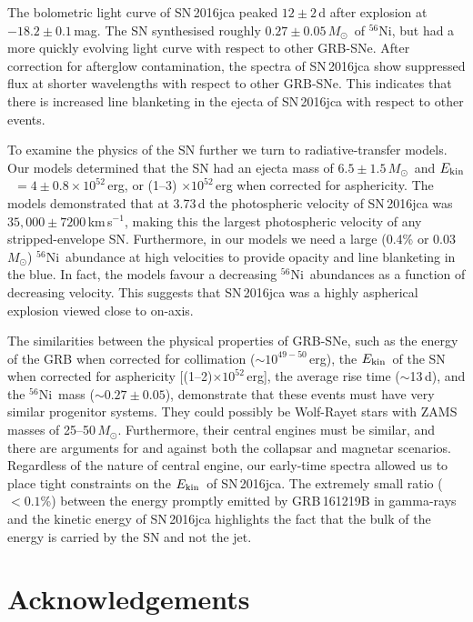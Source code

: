 \documentclass[fleqn,usenatbib]{mnras}
\newcommand{\Msun}{$M_{\odot}$}
\newcommand{\kms}{km\,s$^{-1}$}
\newcommand{\Nifs}{$^{56}$Ni}
\newcommand{\KE}{$E_{\rm kin}$}
\newcommand{\ab}{$\sim$}
\begin{document}
The bolometric light curve of SN\,2016jca peaked $12 \pm 2$\,d after explosion at $-18.2 \pm 0.1$\,mag.
The SN  synthesised roughly $0.27 \pm 0.05$\,\Msun\ of \Nifs, but had a more quickly evolving light curve with respect to other GRB-SNe. 
After correction for afterglow contamination, the spectra of SN\,2016jca show
suppressed flux at shorter wavelengths with respect to other GRB-SNe. This indicates that there is increased line blanketing in the ejecta of SN\,2016jca with respect to other events. 

To examine the physics of the SN further we turn to radiative-transfer models. 
Our models determined that the SN had an ejecta mass of $6.5 \pm 1.5$\,\Msun\ and 
\KE\ $=4\pm0.8\times10^{52}$\,erg, or (1--3) $\times10^{52}$\,erg
when corrected for asphericity. The models demonstrated 
that at 3.73\,d the photospheric velocity
of SN\,2016jca was $35,000 \pm 7200$\,\kms, making this the largest photospheric velocity
of any stripped-envelope SN. Furthermore, in our models we need a large (0.4\% or 0.03\,\Msun) \Nifs\ abundance 
at high velocities to provide opacity and line blanketing in the blue. In fact, the models
favour a decreasing \Nifs\ abundances as a function of decreasing velocity. This suggests that SN\,2016jca was a highly aspherical explosion viewed close to on-axis. 

The similarities between the physical properties of GRB-SNe, such as the energy of the GRB when corrected for collimation (\ab$10^{49-50}$\,erg),
the \KE\ of the SN when corrected for asphericity [(1--2)$ \times10^{52}$\,erg], the average rise time (\ab13\,d), and the \Nifs\ mass (\ab$0.27\pm0.05$), demonstrate that these events must have very similar progenitor 
systems. They could possibly be Wolf-Rayet stars with ZAMS masses of 25--50\,\Msun. 
Furthermore, their central engines must be similar, and there are arguments for and against both the collapsar and magnetar scenarios. 
Regardless of the nature of central engine, our early-time 
spectra allowed us to place tight constraints on the \KE\ of SN\,2016jca. The
extremely small ratio ($<0.1$\%) between the energy promptly emitted by
GRB\,161219B in gamma-rays and the kinetic energy of SN\,2016jca highlights the fact
that the bulk of the energy is carried by the SN and not the jet.

\section*{Acknowledgements} 
\end{document}

